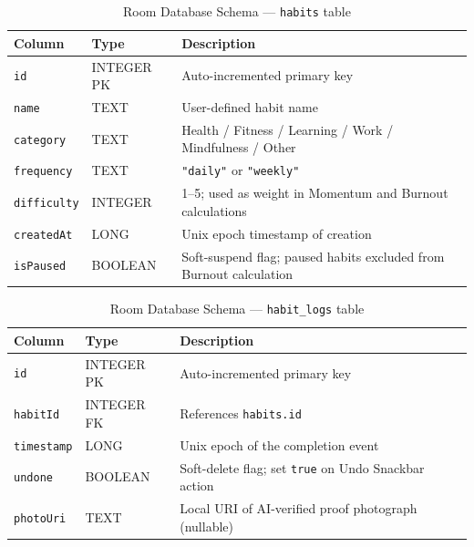 \documentclass[12pt,a4paper]{article}
\begin{document}
\begin{table}[H]
\centering
\caption{Room Database Schema --- \texttt{habits} table}
\label{tab:schema_habits}
\renewcommand{\arraystretch}{1.3}
\begin{tabular}{p{2.8cm} p{2.4cm} p{6.5cm}}
\toprule
\textbf{Column} & \textbf{Type} & \textbf{Description} \\
\midrule
\texttt{id}        & INTEGER PK   & Auto-incremented primary key \\
\texttt{name}      & TEXT         & User-defined habit name \\
\texttt{category}  & TEXT         & Health / Fitness / Learning / Work / Mindfulness / Other \\
\texttt{frequency} & TEXT         & \texttt{"daily"} or \texttt{"weekly"} \\
\texttt{difficulty}& INTEGER      & 1--5; used as weight in Momentum and Burnout calculations \\
\texttt{createdAt} & LONG         & Unix epoch timestamp of creation \\
\texttt{isPaused}  & BOOLEAN      & Soft-suspend flag; paused habits excluded from Burnout calculation \\
\bottomrule
\end{tabular}
\end{table}

\begin{table}[H]
\centering
\caption{Room Database Schema --- \texttt{habit\_logs} table}
\label{tab:schema_logs}
\renewcommand{\arraystretch}{1.3}
\begin{tabular}{p{2.8cm} p{2.4cm} p{6.5cm}}
\toprule
\textbf{Column} & \textbf{Type} & \textbf{Description} \\
\midrule
\texttt{id}        & INTEGER PK   & Auto-incremented primary key \\
\texttt{habitId}   & INTEGER FK   & References \texttt{habits.id} \\
\texttt{timestamp} & LONG         & Unix epoch of the completion event \\
\texttt{undone}    & BOOLEAN      & Soft-delete flag; set \texttt{true} on Undo Snackbar action \\
\texttt{photoUri}  & TEXT         & Local URI of AI-verified proof photograph (nullable) \\
\bottomrule
\end{tabular}
\end{table}
\end{document}
